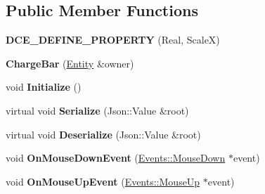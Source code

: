 \subsection*{Public Member Functions}
\begin{DoxyCompactItemize}
\item 
\hypertarget{classDCEngine_1_1Components_1_1ChargeBar_a12cf7abcf6848763e8c2a16d8742967a}{{\bfseries D\-C\-E\-\_\-\-D\-E\-F\-I\-N\-E\-\_\-\-P\-R\-O\-P\-E\-R\-T\-Y} (Real, Scale\-X)}\label{classDCEngine_1_1Components_1_1ChargeBar_a12cf7abcf6848763e8c2a16d8742967a}

\item 
\hypertarget{classDCEngine_1_1Components_1_1ChargeBar_a520c05355566455db5f9ee842b0143db}{{\bfseries Charge\-Bar} (\hyperlink{classDCEngine_1_1Entity}{Entity} \&owner)}\label{classDCEngine_1_1Components_1_1ChargeBar_a520c05355566455db5f9ee842b0143db}

\item 
\hypertarget{classDCEngine_1_1Components_1_1ChargeBar_a24241ddbf4aa4584bd81784388608aa5}{void {\bfseries Initialize} ()}\label{classDCEngine_1_1Components_1_1ChargeBar_a24241ddbf4aa4584bd81784388608aa5}

\item 
\hypertarget{classDCEngine_1_1Components_1_1ChargeBar_a882ce7780f27fc039314ae9e8704026d}{virtual void {\bfseries Serialize} (Json\-::\-Value \&root)}\label{classDCEngine_1_1Components_1_1ChargeBar_a882ce7780f27fc039314ae9e8704026d}

\item 
\hypertarget{classDCEngine_1_1Components_1_1ChargeBar_abb0a733a8acaf24a0f95638909614053}{virtual void {\bfseries Deserialize} (Json\-::\-Value \&root)}\label{classDCEngine_1_1Components_1_1ChargeBar_abb0a733a8acaf24a0f95638909614053}

\item 
\hypertarget{classDCEngine_1_1Components_1_1ChargeBar_aa03de6a9e167207f6b97474427fe0d0e}{void {\bfseries On\-Mouse\-Down\-Event} (\hyperlink{classDCEngine_1_1Events_1_1MouseDown}{Events\-::\-Mouse\-Down} $\ast$event)}\label{classDCEngine_1_1Components_1_1ChargeBar_aa03de6a9e167207f6b97474427fe0d0e}

\item 
\hypertarget{classDCEngine_1_1Components_1_1ChargeBar_a09fb506b87d4ace2d3524bee17dd0361}{void {\bfseries On\-Mouse\-Up\-Event} (\hyperlink{classDCEngine_1_1Events_1_1MouseUp}{Events\-::\-Mouse\-Up} $\ast$event)}\label{classDCEngine_1_1Components_1_1ChargeBar_a09fb506b87d4ace2d3524bee17dd0361}


\end{DoxyCompactItemize}
